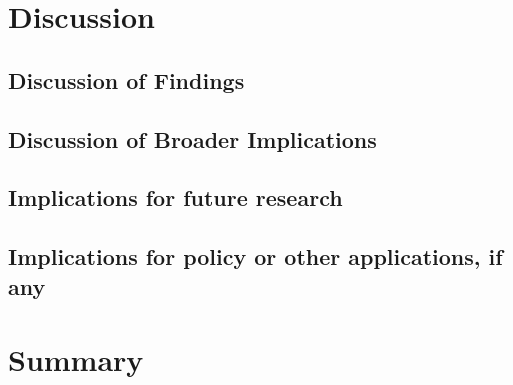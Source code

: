 \documentclass[pdftex,12pt]{llncs}
\begin{document}
\section{Discussion}
%


\subsection{Discussion of Findings}


\subsection{Discussion of Broader Implications}


\subsection{Implications for future research}


\subsection{Implications for policy or other applications, if any}


\section{Summary}

%
%
\end{document}
